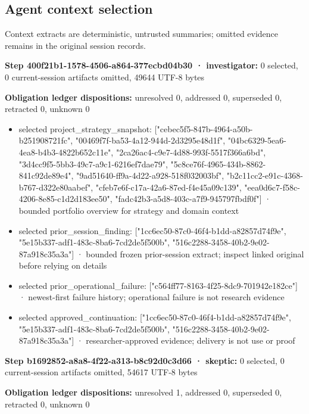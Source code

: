 \documentclass[11pt]{article}
\begin{document}
\subsection{Agent context selection}
Context extracts are deterministic, untrusted summaries; omitted evidence remains in the original session records.\par
\textbf{Step 400f21b1-1578-4506-a864-377ecbd04b30 · investigator:} 0 selected, 0 current-session artifacts omitted, 49644 UTF-8 bytes\par
\textbf{Obligation ledger dispositions:} unresolved 0, addressed 0, superseded 0, retracted 0, unknown 0\par
\begin{itemize}
\item selected project\_strategy\_snapshot: ["cebec5f5-847b-4964-a50b-b251908721fc", "00469f7f-ba53-4a12-944d-2d3295e48d1f", "04bc6329-5ea6-4ea8-b4b3-4822b652c11e", "2ca26ac4-c9e7-4d88-993f-5517f366a6bd", "3d4cc9f5-5bb3-49c7-a9c1-6216ef7dae79", "5c8ce76f-4965-434b-8862-841c92de89e4", "9ad51640-ff9a-4d22-a928-518f032003bf", "b2c11cc2-e91c-4368-b767-d322e80aabef", "cfeb7e6f-c17a-42a6-87ed-f4e45a09c139", "eea0d6c7-f58c-4206-8e85-c1d2d183ee50", "fadc42b3-a5d8-403c-a7f9-945797fbdf0f"] · bounded portfolio overview for strategy and domain context
\item selected prior\_session\_finding: ["1cc6ec50-87c0-46f4-b1dd-a82857d74f9e", "5e15b337-adf1-483c-8ba6-7cd2de5f500b", "516c2288-3458-40b2-9e02-87a918c35a3a"] · bounded frozen prior-session extract; inspect linked original before relying on details
\item selected prior\_operational\_failure: ["c564ff77-8163-4f25-8dc9-701942e182ce"] · newest-first failure history; operational failure is not research evidence
\item selected approved\_continuation: ["1cc6ec50-87c0-46f4-b1dd-a82857d74f9e", "5e15b337-adf1-483c-8ba6-7cd2de5f500b", "516c2288-3458-40b2-9e02-87a918c35a3a"] · researcher-approved evidence; delivery is not use or proof
\end{itemize}
\textbf{Step b1692852-a8a8-4f22-a313-b8c92d0c3d66 · skeptic:} 0 selected, 0 current-session artifacts omitted, 54617 UTF-8 bytes\par
\textbf{Obligation ledger dispositions:} unresolved 1, addressed 0, superseded 0, retracted 0, unknown 0\par
\end{document}
